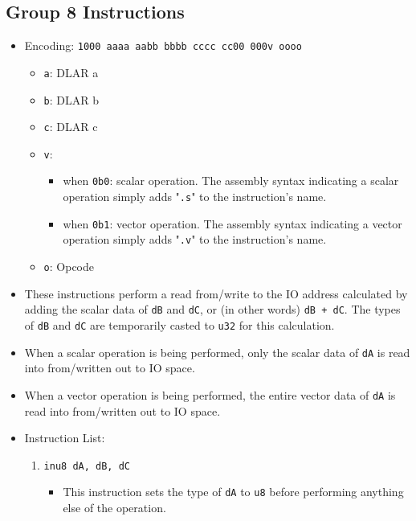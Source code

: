 \documentclass{article}
\begin{document}
	\subsection{Group 8 Instructions}
		\begin{itemize}
		\item Encoding:  \texttt{1000 aaaa aabb bbbb  cccc cc00 000v oooo}
			\begin{itemize}
			\item \texttt{a}:  DLAR a
			\item \texttt{b}:  DLAR b
			\item \texttt{c}:  DLAR c
			\item \texttt{v}:
				\begin{itemize}
				\item when \texttt{0b0}:  scalar operation.  The assembly
				syntax indicating a scalar operation simply adds
				"\texttt{.s}" to the instruction's name.
				\item when \texttt{0b1}:  vector operation.  The assembly
				syntax indicating a vector operation simply adds
				"\texttt{.v}" to the instruction's name.
				\end{itemize}
			\item \texttt{o}:  Opcode
			\end{itemize}

		\item These instructions perform a read from/write to the IO
		address calculated by adding the scalar data of \texttt{dB} and
		\texttt{dC}, or (in other words) \texttt{dB + dC}.  The types of
		\texttt{dB} and \texttt{dC} are temporarily casted to \texttt{u32}
		for this calculation.

		\item When a scalar operation is being performed, only the
		scalar data of \texttt{dA} is read into from/written out to IO
		space.

		\item When a vector operation is being performed, the
		entire vector data of \texttt{dA} is read into from/written out to
		IO space.

		\item Instruction List:
			\begin{enumerate}
			\item \texttt{inu8 dA, dB, dC}
				\begin{itemize}
				\item This instruction sets the type of \texttt{dA} to
				\texttt{u8} before performing anything else of the
				operation.


\end{itemize}
\end{enumerate}
\end{itemize}
\end{document}
